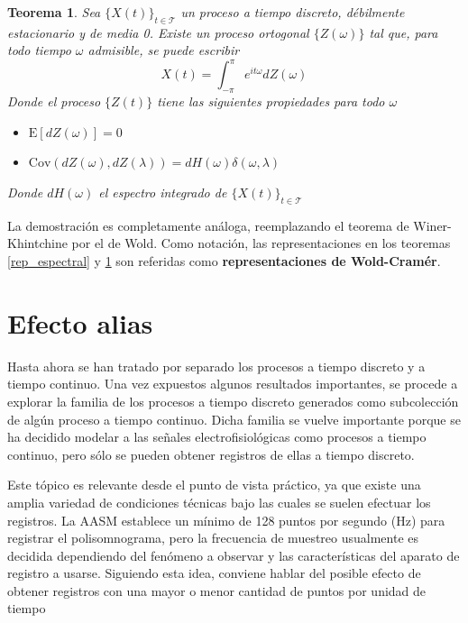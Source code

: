 \documentclass[12pt,letterpaper,draft]{book}
\newtheorem{teorema}{Teorema}[chapter]
\newcommand{\intPI}{\int_{-\pi}^{\pi}}
\newcommand{\E}[1]{\mathrm{E}\left[ #1 \right]}
\newcommand{\Cov}[1]{\mathrm{Cov}\left( #1 \right)}
\newcommand{\abso}[1]{\left| #1 \right|}
\newcommand{\xt}{$\{X(t)\}_{t\in \mathcal{T}}$ }
\newcommand{\hz}{\si{\hertz}\xspace}
\begin{document}
\begin{teorema}
Sea \xt un proceso a tiempo discreto, débilmente estacionario y de media 0. Existe un proceso ortogonal $\{Z(\omega)\}$ tal que, para todo tiempo $\omega$ admisible, se puede escribir
\begin{equation*}
X(t) = \intPI e^{i t \omega} dZ(\omega)
\end{equation*}
Donde el proceso $\{Z(t)\}$ tiene las siguientes propiedades para todo $\omega$
\begin{itemize}
\item $\E{dZ(\omega)} = 0$
\item $\Cov{dZ(\omega),dZ(\lambda)} = dH(\omega) \delta(\omega, \lambda)$
\end{itemize}
Donde $dH(\omega)$ el espectro integrado de \xt
\label{rep_espectral2}
\end{teorema}

La demostración es completamente análoga, reemplazando el teorema de Winer-Khintchine por el de Wold. Como notación, las representaciones en los teoremas \ref{rep_espectral} y \ref{rep_espectral2} son referidas como \textbf{representaciones de Wold-Cramér}.


\section{Efecto {alias}}

Hasta ahora se han tratado por separado los procesos a tiempo discreto y a tiempo continuo. 
%
Una vez expuestos algunos resultados importantes, se procede a explorar la familia de los procesos a tiempo discreto generados como subcolección de algún proceso a tiempo continuo. 
%
Dicha familia se vuelve importante porque se ha decidido modelar a las señales electrofisiológicas como procesos a tiempo continuo, pero sólo se pueden obtener registros de ellas a tiempo discreto.

Este tópico es relevante desde el punto de vista práctico, ya que existe una amplia variedad de condiciones técnicas bajo las cuales se suelen efectuar los registros. La AASM establece un mínimo de 128 puntos por segundo (\hz) para registrar el polisomnograma, pero la frecuencia de muestreo usualmente es decidida dependiendo del fenómeno a observar y las características del aparato de registro a usarse.
%
Siguiendo esta idea, conviene hablar del posible efecto de obtener registros con una mayor o menor cantidad de puntos por unidad de tiempo
\end{document}
